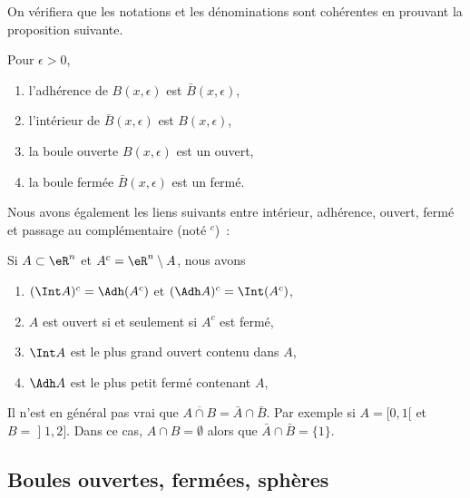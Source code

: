 On vérifiera que les notations et les dénominations sont cohérentes en prouvant la proposition suivante.
\begin{proposition}Pour \( \epsilon > 0\),
	\begin{enumerate}
		\item l'adhérence de \( B(x,\epsilon)\) est \( \bar B(x,\epsilon)\),
		\item l'intérieur de \( \bar B(x,\epsilon)\) est \( B(x,\epsilon)\),
		\item la boule ouverte \( B(x,\epsilon)\) est un ouvert,
		\item la boule fermée \( \bar B(x,\epsilon)\) est un fermé.
	\end{enumerate}
\end{proposition}

Nous avons également les liens suivants entre intérieur, adhérence, ouvert, fermé et passage au complémentaire (noté \( {}^c\))~:
\begin{proposition}
	Si \( A \subset \eR^n\) et \( A^c = \eR^n\setminus A\), nous
	avons
	\begin{enumerate}
		\item \( (\Int A)^c = \Adh (A^c)\) et \( (\Adh A)^c = \Int
		      (A^c)\),
		\item \( A\) est ouvert si et seulement si \( A^c\) est fermé,
		\item \( \Int A\) est le plus grand ouvert contenu dans \( A\),
		\item \( \Adh A\) est le plus petit fermé contenant \( A\),
	\end{enumerate}
\end{proposition}

\begin{example} \label{ExBFLooUNyvbw}
	Il n'est en général pas vrai que \( \overline{ A\cap B }=\bar A\cap \bar B\). Par exemple si \( A=\mathopen[ 0 , 1 [\) et \( B=\mathopen] 1 , 2 \mathclose]\). Dans ce cas, \( A\cap B=\emptyset\) alors que \( \bar A\cap\bar B=\{ 1 \}\).
\end{example}

\subsection{Boules ouvertes, fermées, sphères}

